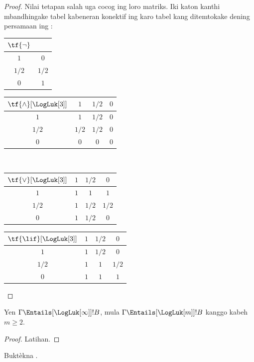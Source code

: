 \documentclass[../../../include/open-logic-section]{subfiles}
\begin{document}
\begin{proof}
  Nilai tetapan salah uga cocog ing loro matriks. Iki katon
  kanthi mbandhingake tabel kabeneran konektif ing
   karo tabel kang ditemtokake
  dening persamaan ing :
  \begin{center}
    \begin{tabular}{c|c} 
      $\tf{\lnot}$ & \\ 
      \hline  
      $1$ & $0$ \\ 
      $1/2$ & $1/2$ \\
      $0$ & $1$ 
    \end{tabular}
    \quad
    \begin{tabular}{c|ccc} 
      $\tf{\land}[\LogLuk[3]]$ & $1$ & $1/2$ & $0$ \\ 
      \hline 
      $1$ & $1$ & $1/2$ & $0$ \\ 
      $1/2$ & $1/2$ & $1/2$ & $0$\\ 
      $0$ & $0$ & $0$ & $0$ 
    \end{tabular}
    \\[2ex]
    \begin{tabular}{c|ccc} 
      $\tf{\lor}[\LogLuk[3]]$ & $1$ & $1/2$ & $0$ \\ 
      \hline 
      $1$ & $1$ & $1$ & $1$ \\ 
      $1/2$ & $1$ & $1/2$ & $1/2$ \\
      $0$ & $1$ & $1/2$ & $0$ 
    \end{tabular}
    \quad
    \begin{tabular}{c|ccc} 
      $\tf{\lif}[\LogLuk[3]]$ & $1$ & $1/2$ & $0$ \\ 
      \hline 
      $1$ & $1$ & $1/2$ & $0$ \\ 
      $1/2$ & $1$ & $1$ & $1/2$  \\ 
      $0$ & $1$ & $1$ & $1$ 
    \end{tabular}
  \end{center} 
\end{proof}

\begin{prop}
  Yen $\Gamma \Entails[\LogLuk[\infty]] !B$, mula $\Gamma
  \Entails[\LogLuk[m]] !B$ kanggo kabeh~$m \ge 2$.
\end{prop}

\begin{proof}
  Latihan.
\end{proof}

\begin{prob}
  Buktèkna .
\end{prob}
\end{document}

